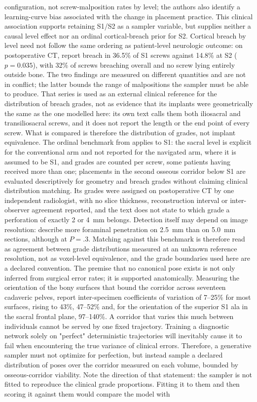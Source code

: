 \documentclass[9pt]{extarticle}
\begin{document}
configuration, not screw-malposition rates by level; the authors also identify a learning-curve bias associated with the change in placement practice. This clinical association supports retaining S1/S2 as a sampler variable, but supplies neither a causal level effect nor an ordinal cortical-breach prior for S2. Cortical breach by level need not follow the same ordering as patient-level neurologic outcome: on postoperative CT, \citet{herman2016} report breach in 36.5\% of S1 screws against 14.8\% at S2 ($p=0.035$), with 32\% of screws breaching overall and no screw lying entirely outside bone. The two findings are measured on different quantities and are not in conflict; the latter bounds the range of malpositions the sampler must be able to produce. That series is used as an external clinical reference for the distribution of breach grades, not as evidence that its implants were geometrically the same as the one modelled here: its own text calls them both iliosacral and transiliosacral screws, and it does not report the length or the end point of every screw. What is compared is therefore the distribution of grades, not implant equivalence. The ordinal benchmark from \citet{zwingmann2009navigated} applies to S1: the sacral level is explicit for the conventional arm and not reported for the navigated arm, where it is assumed to be S1, and grades are counted per screw, some patients having received more than one; placements in the second osseous corridor below S1 are evaluated descriptively for geometry and breach grades without claiming clinical distribution matching. Its grades were assigned on postoperative CT by one independent radiologist, with no slice thickness, reconstruction interval or inter-observer agreement reported, and the text does not state to which grade a perforation of exactly 2 or 4~mm belongs. Detection itself may depend on image resolution: \citet{tejwani2014} describe more foraminal penetration on 2.5~mm than on 5.0~mm sections, although at $P=.3$. Matching against this benchmark is therefore read as agreement between grade distributions measured at an unknown reference resolution, not as voxel-level equivalence, and the grade boundaries used here are a declared convention. The premise that no canonical pose exists is not only inferred from surgical error rates; it is supported anatomically. Measuring the orientation of the bony surfaces that bound the corridor across seventeen cadaveric pelves, \citet{ziran2007fluoroscopic} report inter-specimen coefficients of variation of 7--25\% for most surfaces, rising to 43\%, 47--52\% and, for the orientation of the superior S1 ala in the sacral frontal plane, 97--140\%. A corridor that varies this much between individuals cannot be served by one fixed trajectory. Training a diagnostic network solely on "perfect" deterministic trajectories will inevitably cause it to fail when encountering the true variance of clinical errors. Therefore, a generative sampler must not optimize for perfection, but instead sample a declared distribution of poses over the corridor measured on each volume, bounded by osseous-corridor viability. Note the direction of that statement: the sampler is not fitted to reproduce the clinical grade proportions. Fitting it to them and then scoring it against them would compare the model with 
\end{document}
